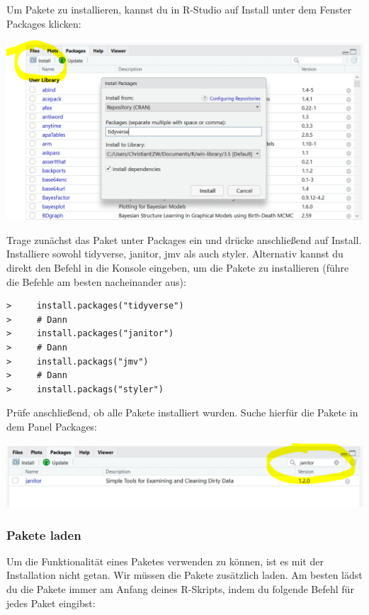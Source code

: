 \documentclass[
]{book}
\begin{document}
Um Pakete zu installieren, kannst du in R-Studio auf Install unter dem Fenster Packages klicken:

\includegraphics{images/02_grundlagen/install_pakete.png}

Trage zunächst das Paket unter Packages ein und drücke anschließend auf Install. Installiere sowohl tidyverse, janitor, jmv als auch styler. Alternativ kannst du direkt den Befehl in die Konsole eingeben, um die Pakete zu installieren (führe die Befehle am besten nacheinander aus):

\begin{verbatim}
>     install.packages("tidyverse")
>     # Dann
>     install.packages("janitor")
>     # Dann
>     install.packags("jmv")
>     # Dann
>     install.packags("styler")
\end{verbatim}

Prüfe anschließend, ob alle Pakete installiert wurden. Suche hierfür die Pakete in dem Panel Packages:

\includegraphics{images/02_grundlagen/pakete_check.png}

\hypertarget{pakete-laden}{%
\subsubsection{Pakete laden}\label{pakete-laden}}

Um die Funktionalität eines Paketes verwenden zu können, ist es mit der Installation nicht getan. Wir müssen die Pakete zusätzlich laden. Am besten lädst du die Pakete immer am Anfang deines R-Skripts, indem du folgende Befehl für jedes Paket eingibst:
\end{document}
